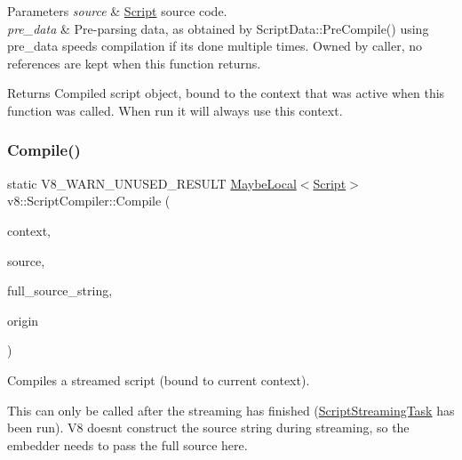 \begin{DoxyParams}{Parameters}
{\em source} & \mbox{\hyperlink{classv8_1_1Script}{Script}} source code. \\
\hline
{\em pre\+\_\+data} & Pre-\/parsing data, as obtained by Script\+Data\+::\+Pre\+Compile() using pre\+\_\+data speeds compilation if it\textquotesingle{}s done multiple times. Owned by caller, no references are kept when this function returns. \\
\hline
\end{DoxyParams}
\begin{DoxyReturn}{Returns}
Compiled script object, bound to the context that was active when this function was called. When run it will always use this context. 
\end{DoxyReturn}
\mbox{\label{classv8_1_1ScriptCompiler_a2381d1572e778efee274caaaaa765e0c}} 
\subsubsection{\texorpdfstring{Compile()}{Compile()}\hspace{0.1cm}{\footnotesize\ttfamily [2/2]}}
{\footnotesize\ttfamily static V8\+\_\+\+W\+A\+R\+N\+\_\+\+U\+N\+U\+S\+E\+D\+\_\+\+R\+E\+S\+U\+LT \mbox{\hyperlink{classv8_1_1MaybeLocal}{Maybe\+Local}}$<$\mbox{\hyperlink{classv8_1_1Script}{Script}}$>$ v8\+::\+Script\+Compiler\+::\+Compile (\begin{DoxyParamCaption}\item[{\mbox{\hyperlink{classv8_1_1Local}{Local}}$<$ Context $>$}]{context,  }\item[{\mbox{\hyperlink{classv8_1_1ScriptCompiler_1_1StreamedSource}{Streamed\+Source}} $\ast$}]{source,  }\item[{\mbox{\hyperlink{classv8_1_1Local}{Local}}$<$ \mbox{\hyperlink{classv8_1_1String}{String}} $>$}]{full\+\_\+source\+\_\+string,  }\item[{const \mbox{\hyperlink{classv8_1_1ScriptOrigin}{Script\+Origin}} \&}]{origin }\end{DoxyParamCaption})\hspace{0.3cm}{\ttfamily [static]}}

Compiles a streamed script (bound to current context).

This can only be called after the streaming has finished (\mbox{\hyperlink{classv8_1_1ScriptCompiler_1_1ScriptStreamingTask}{Script\+Streaming\+Task}} has been run). V8 doesn\textquotesingle{}t construct the source string during streaming, so the embedder needs to pass the full source here. \mbox{\label{classv8_1_1ScriptCompiler_ad3e6937d7ea91ac92d22a3f48844fb57}} 
